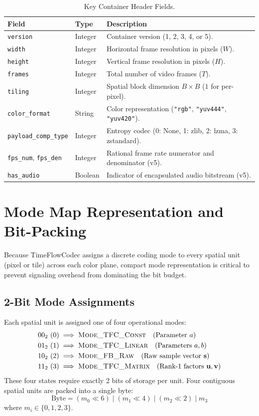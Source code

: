 \begin{table}[h]
\centering
\small
\caption{Key Container Header Fields.}
\label{tab:header_fields}
\begin{tabular}{lll}
\toprule
\textbf{Field} & \textbf{Type} & \textbf{Description} \\
\midrule
\texttt{version} & Integer & Container version (1, 2, 3, 4, or 5). \\
\texttt{width} & Integer & Horizontal frame resolution in pixels ($W$). \\
\texttt{height} & Integer & Vertical frame resolution in pixels ($H$). \\
\texttt{frames} & Integer & Total number of video frames ($T$). \\
\texttt{tiling} & Integer & Spatial block dimension $B \times B$ ($1$ for per-pixel). \\
\texttt{color\_format} & String & Color representation (\texttt{"rgb"}, \texttt{"yuv444"}, \texttt{"yuv420"}). \\
\texttt{payload\_comp\_type} & Integer & Entropy codec (0: None, 1: zlib, 2: lzma, 3: zstandard). \\
\texttt{fps\_num}, \texttt{fps\_den} & Integer & Rational frame rate numerator and denominator (v5). \\
\texttt{has\_audio} & Boolean & Indicator of encapsulated audio bitstream (v5). \\
\bottomrule
\end{tabular}
\end{table}

\section{Mode Map Representation and Bit-Packing}
Because TimeFlowCodec assigns a discrete coding mode to every spatial unit (pixel or tile) across each color plane, compact mode representation is critical to prevent signaling overhead from dominating the bit budget.

\subsection{2-Bit Mode Assignments}
Each spatial unit is assigned one of four operational modes:
\begin{align*}
    00_2 \ (0) &\implies \textsc{Mode\_TFC\_Const} \quad (\text{Parameter } a) \\
    01_2 \ (1) &\implies \textsc{Mode\_TFC\_Linear} \quad (\text{Parameters } a, b) \\
    10_2 \ (2) &\implies \textsc{Mode\_FB\_Raw} \quad (\text{Raw sample vector } \mathbf{s}) \\
    11_2 \ (3) &\implies \textsc{Mode\_TFC\_Matrix} \quad (\text{Rank-1 factors } \mathbf{u}, \mathbf{v})
\end{align*}
These four states require exactly 2 bits of storage per unit. Four contiguous spatial units are packed into a single byte:
\begin{equation}
    \text{Byte} = (m_0 \ll 6) \mid (m_1 \ll 4) \mid (m_2 \ll 2) \mid m_3
\end{equation}
where $m_i \in \{0, 1, 2, 3\}$.

